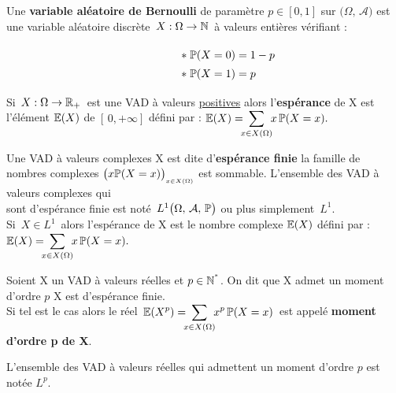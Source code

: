 \vspace{1.5cm}

Une \textbf{variable aléatoire de Bernoulli} de paramètre \(p\in [0,1]\) sur \(\bigl(\Omega,\,\mathcal{A}\bigr)\) est une variable aléatoire discrète \(\,X:\Omega \to \mathbb{N}\,\) à valeurs entières vérifiant :\vspace{-0.3cm}

\[ \hspace{1.5cm} \def\arraystretch{1.4} \arraycolsep=0.15cm
\begin{array}{l}
    \ast \; \PP(X=0)=1-p\\
    \ast \; \PP(X=1)=p
\end{array}\]

\vspace{1.7cm}

Si \(\,X:\Omega \to \mathbb{R}_+\,\) est une VAD à valeurs \underline{positives} alors l'\textbf{espérance} de X est l'élément \(\mathbb{E}(X)\) de \([\,0,+\infty]\) défini par : \(\displaystyle \mathbb{E}(X)=\!\!\!\sum_{x\in X(\Omega)}\!\!x\,\mathbb{P}(X=x).\) 

\vspace{1.5cm}

Une VAD à valeurs complexes X est dite d'\textbf{espérance finie} \ssi la famille de nombres complexes \(\bigl(x\mathbb{P}(X=x)\bigr)_{_{x\in X(\Omega)}}\) est sommable. L'ensemble des VAD à valeurs complexes qui\vspace{0.1cm}\\
sont d'espérance finie est noté \(\,L^1\bigl(\Omega,\,\mathcal{A},\,\mathbb{P}\bigr)\) ou plus simplement \(\,L^1\).\vspace{0.4cm}\\
Si \(\,X\in L^1\,\) alors l'espérance de X est le nombre complexe \(\mathbb{E}(X)\) défini par : \(\displaystyle \mathbb{E}(X)=\!\!\!\sum_{x\in X(\Omega)}\!\!x\,\mathbb{P}(X=x).\)

\vspace{1.3cm}

Soient X un VAD à valeurs réelles et \(p\in \mathbb{N}^{^*}\). On dit que X admet un moment d'ordre $p$ \ssi X est d'espérance finie.\vspace{0.1cm}\\
Si tel est le cas alors le réel \(\, \displaystyle \mathbb{E}(X^p)=\!\!\!\sum_{x\in X(\Omega)}\!\!x^p\,\mathbb{P}(X=x)\,\) est appelé \textbf{moment d'ordre p de X}.\vspace{0.2cm}

\begin{small}
    \noindent L'ensemble des VAD à valeurs réelles qui admettent un moment d'ordre $p$ est notée \(L^p\).
\end{small}

